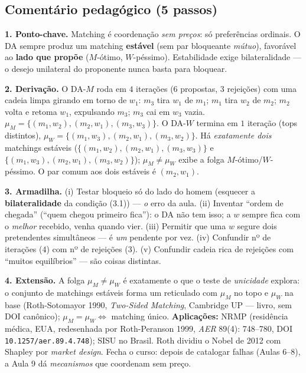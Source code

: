 \documentclass[11pt,a4paper]{article}
\newcommand{\passo}[1]{\smallskip\noindent\textbf{\textcolor{insper}{#1}}\quad}
\begin{document}
\subsection*{Comentário pedagógico (5 passos)}
\begin{gabarito}
\passo{1. Ponto-chave.} Matching é coordenação \emph{sem preços}: só preferências ordinais.
O DA sempre produz um matching \textbf{estável} (sem par bloqueante \emph{mútuo}), favorável ao
\textbf{lado que propõe} ($M$-ótimo, $W$-péssimo). Estabilidade exige bilateralidade — o desejo
unilateral do proponente nunca basta para bloquear.

\passo{2. Derivação.} O DA-$M$ roda em $4$ iterações ($6$ propostas, $3$ rejeições) com uma
cadeia limpa girando em torno de $w_1$: $m_3$ tira $w_1$ de $m_1$; $m_1$ tira $w_2$ de $m_2$;
$m_2$ volta e retoma $w_1$, expulsando $m_3$; $m_3$ cai em $w_3$ vazia.
$\mu_M=\{(m_1,w_2),(m_2,w_1),(m_3,w_3)\}$. O DA-$W$ termina em $1$ iteração (tops distintos),
$\mu_W=\{(m_1,w_3),(m_2,w_1),(m_3,w_2)\}$. Há \emph{exatamente dois} matchings estáveis
($\{(m_1,w_2),(m_2,w_1),(m_3,w_3)\}$ e $\{(m_1,w_3),(m_2,w_1),(m_3,w_2)\}$); $\mu_M\ne\mu_W$
exibe a folga $M$-ótimo/$W$-péssimo. O par comum aos dois estáveis é $(m_2,w_1)$.

\passo{3. Armadilha.} (i) Testar bloqueio só do lado do homem (esquecer a \textbf{bilateralidade}
da condição (3.1)) — \emph{o} erro da aula. (ii) Inventar ``ordem de chegada'' (``quem chegou
primeiro fica''): o DA não tem isso; a $w$ sempre fica com o \emph{melhor} recebido, venha quando
vier. (iii) Permitir que uma $w$ segure dois pretendentes simultâneos — é \emph{um} pendente por
vez. (iv) Confundir nº de iterações ($4$) com nº de rejeições ($3$). (v) Confundir cadeia rica de
rejeições com ``muitos equilíbrios'' — são coisas distintas.

\passo{4. Extensão.} A folga $\mu_M\ne\mu_W$ é exatamente o que o teste de \emph{unicidade}
explora: o conjunto de matchings estáveis forma um reticulado com $\mu_M$ no topo e $\mu_W$ na
base (Roth-Sotomayor 1990, \emph{Two-Sided Matching}, Cambridge UP — livro, sem DOI canônico);
$\mu_M=\mu_W\iff$ matching único. \textbf{Aplicações:} NRMP (residência médica, EUA, redesenhada
por Roth-Peranson 1999, \emph{AER} 89(4): 748--780, DOI \texttt{10.1257/aer.89.4.748}); SISU no
Brasil. Roth dividiu o Nobel de 2012 com Shapley por \emph{market design}. Fecha o curso: depois
de catalogar falhas (Aulas 6--8), a Aula 9 dá \emph{mecanismos} que coordenam sem preço.


\end{gabarito}
\end{document}
